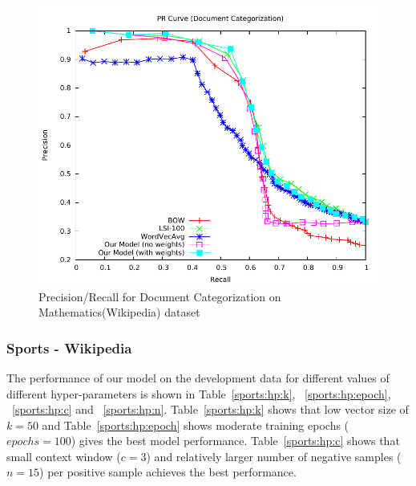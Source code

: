 \begin{figure}[tb]
\centering
        \includegraphics[width=0.8\columnwidth]{figs/pr/mathematics-cs-scala.pdf}
        \vskip -4mm
    \caption{\footnotesize Precision/Recall for Document Categorization on Mathematics(Wikipedia) dataset}
    \label{fig:pr:mathematics:cs} 
\end{figure}

\subsubsection{Sports - Wikipedia}
The performance of our model on the development data for different values of different hyper-parameters is shown in Table~\ref{sports:hp:k}, ~\ref{sports:hp:epoch}, ~\ref{sports:hp:c} and ~\ref{sports:hp:n}. Table~\ref{sports:hp:k} shows that low vector size of $k = 50$ and Table~\ref{sports:hp:epoch} shows moderate training epochs ($epochs = 100$) gives the best model performance. 
Table~\ref{sports:hp:c} shows that small context window ($c = 3$) and relatively larger number of negative samples ($n = 15$) per positive sample achieves the best performance.

